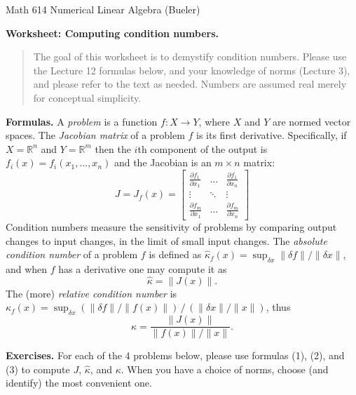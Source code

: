 \documentclass[11pt]{amsart}
\newcommand{\RR}{\mathbb{R}}
\begin{document}
\scriptsize \noindent Math 614 Numerical Linear Algebra (Bueler) \hfill {}
\normalsize\medskip

\Large\centerline{\textbf{Worksheet: Computing condition numbers.}}
\medskip
\normalsize

\thispagestyle{empty}

\begin{quote}
The goal of this worksheet is to demystify condition numbers.  Please use the Lecture 12 formulas below, and your knowledge of norms (Lecture 3), and please refer to the text as needed.  Numbers are assumed real merely for conceptual simplicity.
\end{quote}

\bigskip
\noindent \textbf{Formulas.}  A \emph{problem} is a function $f:X \to Y$, where $X$ and $Y$ are normed vector spaces.  The \emph{Jacobian matrix} of a problem $f$ is its first derivative.  Specifically, if $X=\RR^n$ and $Y=\RR^m$ then the $i$th component of the output is $f_i(x)=f_i(x_1,\dots,x_n)$ and the Jacobian is an $m\times n$ matrix:
\begin{equation}
J = J_f(x) = \begin{bmatrix} \frac{\partial f_1}{\partial x_1} & \dots & \frac{\partial f_1}{\partial x_n} \\ \vdots & \ddots & \vdots \\ \frac{\partial f_m}{\partial x_1} & \dots & \frac{\partial f_m}{\partial x_n} \end{bmatrix}
\end{equation}
Condition numbers measure the sensitivity of problems by comparing output changes to input changes, in the limit of small input changes.  The \emph{absolute condition number} of a problem $f$ is defined as $\hat \kappa_f(x) = \sup_{\delta x} \|\delta f\|/\|\delta x\|$, and when $f$ has a derivative one may compute it as
\begin{equation}
\hat \kappa = \|J(x)\|.
\end{equation}
The (more) \emph{relative condition number} is $\kappa_f(x) = \sup_{\delta x} (\|\delta f\|/\|f(x)\|) \,/\, (\|\delta x\|/\|x\|)$, thus
\begin{equation}
\kappa = \frac{\|J(x)\|}{\|f(x)\|/\|x\|}.
\end{equation}

\bigskip
\noindent \textbf{Exercises.}  For each of the 4 problems below, please use formulas (1), (2), and (3) to compute $J$, $\hat \kappa$, and $\kappa$.  When you have a choice of norms, choose (and identify) the most convenient one.
\end{document}
